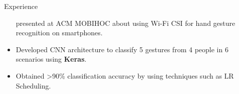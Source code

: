 \documentclass{resume} %
\begin{document}
\begin{workSection}{Experience}
\begin{itemize}
        presented at ACM MOBIHOC about using Wi-Fi CSI for hand gesture recognition on smartphones.
        \item Developed CNN architecture to classify 5 gestures from 4 people in 6 scenarios using \textbf{Keras}. %
        \item Obtained >90\% classification accuracy by using techniques such as LR Scheduling. %
    \end{itemize}

\end{workSection}
\end{document}
